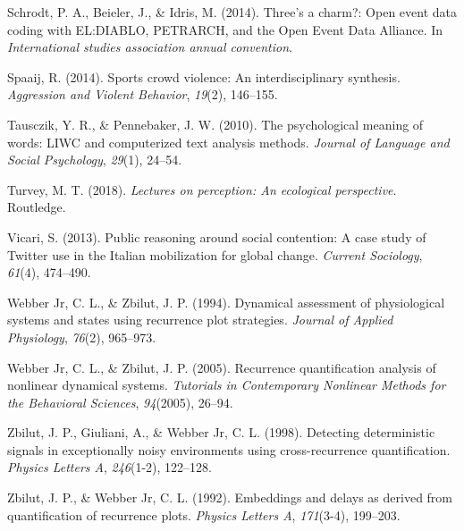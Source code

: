 \documentclass[english,man]{apa6}
\begin{document}
\leavevmode\hypertarget{ref-schrodt2014three}{}%
Schrodt, P. A., Beieler, J., \& Idris, M. (2014). Three's a charm?: Open event data coding with EL:DIABLO, PETRARCH, and the Open Event Data Alliance. In \emph{International studies association annual convention}.

\leavevmode\hypertarget{ref-spaaij2014sports}{}%
Spaaij, R. (2014). Sports crowd violence: An interdisciplinary synthesis. \emph{Aggression and Violent Behavior}, \emph{19}(2), 146--155.

\leavevmode\hypertarget{ref-tausczik2010psychological}{}%
Tausczik, Y. R., \& Pennebaker, J. W. (2010). The psychological meaning of words: LIWC and computerized text analysis methods. \emph{Journal of Language and Social Psychology}, \emph{29}(1), 24--54.

\leavevmode\hypertarget{ref-turvey2018lectures}{}%
Turvey, M. T. (2018). \emph{Lectures on perception: An ecological perspective}. Routledge.

\leavevmode\hypertarget{ref-vicari2013public}{}%
Vicari, S. (2013). Public reasoning around social contention: A case study of Twitter use in the Italian mobilization for global change. \emph{Current Sociology}, \emph{61}(4), 474--490.

\leavevmode\hypertarget{ref-webber1994dynamical}{}%
Webber Jr, C. L., \& Zbilut, J. P. (1994). Dynamical assessment of physiological systems and states using recurrence plot strategies. \emph{Journal of Applied Physiology}, \emph{76}(2), 965--973.

\leavevmode\hypertarget{ref-webber2005recurrence}{}%
Webber Jr, C. L., \& Zbilut, J. P. (2005). Recurrence quantification analysis of nonlinear dynamical systems. \emph{Tutorials in Contemporary Nonlinear Methods for the Behavioral Sciences}, \emph{94}(2005), 26--94.

\leavevmode\hypertarget{ref-zbilut1998detecting}{}%
Zbilut, J. P., Giuliani, A., \& Webber Jr, C. L. (1998). Detecting deterministic signals in exceptionally noisy environments using cross-recurrence quantification. \emph{Physics Letters A}, \emph{246}(1-2), 122--128.

\leavevmode\hypertarget{ref-zbilut1992embeddings}{}%
Zbilut, J. P., \& Webber Jr, C. L. (1992). Embeddings and delays as derived from quantification of recurrence plots. \emph{Physics Letters A}, \emph{171}(3-4), 199--203.

\endgroup
\end{document}
